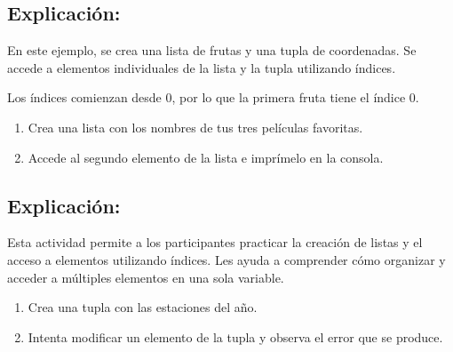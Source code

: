 \documentclass[
  a4paper,
  DIV=11,
  numbers=noendperiod,
  onepage,
  openany]{scrreprt}
\providecommand{\tightlist}{%
  \setlength{\itemsep}{0pt}\setlength{\parskip}{0pt}}\usepackage{longtable,booktabs,array}
\begin{document}
\subsection{Explicación:}\label{explicaciuxf3n-7}

En este ejemplo, se crea una lista de frutas y una tupla de coordenadas.
Se accede a elementos individuales de la lista y la tupla utilizando
índices.

Los índices comienzan desde 0, por lo que la primera fruta tiene el
índice 0.

\begin{tcolorbox}[enhanced jigsaw, leftrule=.75mm, bottomtitle=1mm, title=\textcolor{quarto-callout-tip-color}{\faLightbulb}\hspace{0.5em}{Actividad Práctica (Listas):}, colbacktitle=quarto-callout-tip-color!10!white, coltitle=black, bottomrule=.15mm, colframe=quarto-callout-tip-color-frame, titlerule=0mm, opacityback=0, rightrule=.15mm, toptitle=1mm, opacitybacktitle=0.6, arc=.35mm, breakable, colback=white, toprule=.15mm, left=2mm]

\begin{enumerate}
\def\labelenumi{\arabic{enumi}.}
\tightlist
\item
  Crea una lista con los nombres de tus tres películas favoritas.
\item
  Accede al segundo elemento de la lista e imprímelo en la consola.
\end{enumerate}

\end{tcolorbox}

\subsection{Explicación:}\label{explicaciuxf3n-8}

Esta actividad permite a los participantes practicar la creación de
listas y el acceso a elementos utilizando índices. Les ayuda a
comprender cómo organizar y acceder a múltiples elementos en una sola
variable.

\begin{tcolorbox}[enhanced jigsaw, leftrule=.75mm, bottomtitle=1mm, title=\textcolor{quarto-callout-tip-color}{\faLightbulb}\hspace{0.5em}{Actividad Práctica (Tuplas):}, colbacktitle=quarto-callout-tip-color!10!white, coltitle=black, bottomrule=.15mm, colframe=quarto-callout-tip-color-frame, titlerule=0mm, opacityback=0, rightrule=.15mm, toptitle=1mm, opacitybacktitle=0.6, arc=.35mm, breakable, colback=white, toprule=.15mm, left=2mm]

\begin{enumerate}
\def\labelenumi{\arabic{enumi}.}
\tightlist
\item
  Crea una tupla con las estaciones del año.
\item
  Intenta modificar un elemento de la tupla y observa el error que se
  produce.
\end{enumerate}

\end{tcolorbox}
\end{document}
